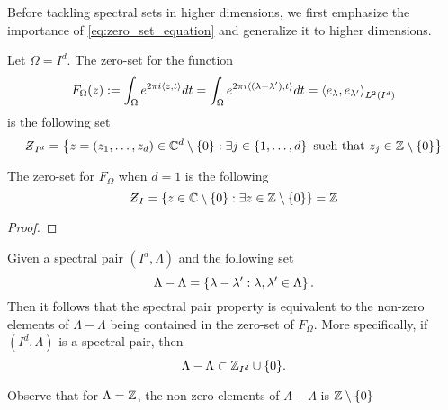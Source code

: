 \documentclass[../thesis.tex]{subfiles}
\begin{document}
Before tackling spectral sets in higher dimensions, we first emphasize the importance of \cref{eq:zero_set_equation} and generalize it to higher dimensions. 
\begin{lemma}
    Let $\Omega=I^d$. The zero-set for the function
    \begin{equation*}
        F_{\Omega} (z):= \int_\Omega e^{2 \pi i \langle z,t\rangle} dt  = \int_\Omega e^{2 \pi i \langle(\lambda-\lambda'),t\rangle} dt = \left \langle e_{\lambda},e_{\lambda'}  \right \rangle_{L^2(I^d)}
    \end{equation*}
    is the following set
    \begin{equation*}
        \Zstroke_{I^d} = \braqMed{ z = \brac{z_1,\dots,z_d}\in \C^d \setminus \braqMed{0} : \exists \space j \in \braqMed{1,\dots, d} \text{ such that } z_j \in  \Z\setminus \braqMed{0}}
    \end{equation*}
\end{lemma}

\begin{example}
    The zero-set for $F_{\Omega}$ when $d=1$ is the following
    \begin{equation*}
        \Zstroke_{I} = \braqMed{ z \in \C \setminus \braqMed{0} : \exists \space z \in  \Z\setminus \braqMed{0}} = \Z 
    \end{equation*}
\end{example}

\begin{proof}
    
\end{proof}

\begin{remark}
    Given a spectral pair $(I^d,\Lambda)$ and the following set 
    \begin{equation*}
        \Lambda - \Lambda = \left\{\lambda-\lambda' : \lambda,\lambda' \in \Lambda\right\}.
    \end{equation*}
    Then it follows that the spectral pair property is equivalent to the non-zero elements of $\Lambda - \Lambda$ being contained in the zero-set of $F_{\Omega}$. More specifically, if $(I^d,\Lambda)$ is a spectral pair, then
    \begin{equation*}
        \Lambda - \Lambda \subset \mathbb{Z}_{I^d} \cup \{0\}. 
    \end{equation*}
\end{remark}

\begin{example}
    Observe that for $\Lambda=\mathbb{Z}$, the non-zero elements of $\Lambda - \Lambda$ is $\mathbb{Z}\setminus \{0\}$
\end{example}
\end{document}

